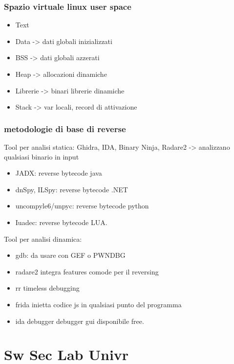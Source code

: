 \documentclass[oneside,a4paper,11pt]{book}
\theoremstyle{italicstyle}
\theoremstyle{normStyle}
\begin{document}
\subsection{Spazio virtuale linux user space}

 \begin{itemize}
  \item Text
  \item Data -> dati globali inizializzati
\item BSS -> dati globali azzerati
\item Heap -> allocazioni dinamiche
\item Librerie -> binari librerie dinamiche
\item Stack -> var locali, record di attivazione
\end{itemize}

\subsection{metodologie di base di reverse}
Tool per analisi statica: Ghidra, IDA, Binary Ninja, Radare2 -> analizzano qualsiasi binario in input\\
\begin{itemize}
\item JADX: reverse bytecode java
\item dnSpy, ILSpy: reverse bytecode .NET
\item uncompyle6/unpyc: reverse bytecode python
\item Iuadec: reverse bytecode LUA.
\end{itemize}
Tool per analisi dinamica:
\begin{itemize}
\item gdb: da usare con GEF o PWNDBG
\item radare2 integra features comode per il reversing
\item rr timeless debugging
\item frida inietta codice js in qualsiasi punto del programma
\item ida debugger debugger gui disponibile free.
\end{itemize}

\chapter{Sw Sec Lab Univr}
\end{document}
